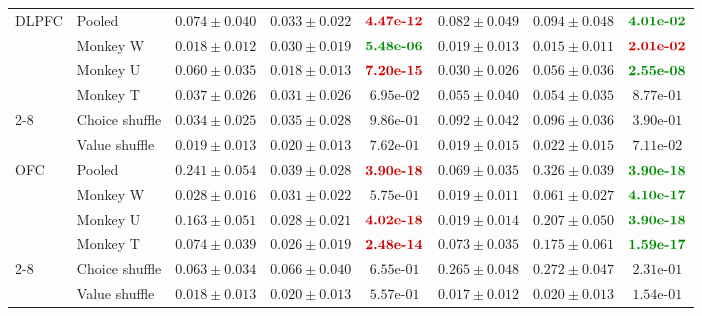 \documentclass[pdflatex,sn-mathphys-num]{sn-jnl}%
\begin{document}
\begin{table}[p]
\begin{tabular*}{\textwidth}{@{\extracolsep{\fill}}llcccccc@{}}
\midrule
DLPFC & Pooled & $0.074 \pm  0.040$ & $0.033 \pm  0.022$ & $\textcolor[HTML]{CC0000}{\text{\bfseries \mbox{4.47e-12}}}$ & $0.082 \pm  0.049$ & $0.094 \pm  0.048$ & $\textcolor[HTML]{008C00}{\text{\bfseries \mbox{4.01e-02}}}$ \\
  & Monkey W & $0.018 \pm  0.012$ & $0.030 \pm  0.019$ & $\textcolor[HTML]{008C00}{\text{\bfseries \mbox{5.48e-06}}}$ & $0.019 \pm  0.013$ & $0.015 \pm  0.011$ & $\textcolor[HTML]{CC0000}{\text{\bfseries \mbox{2.01e-02}}}$ \\
  & Monkey U & $0.060 \pm  0.035$ & $0.018 \pm  0.013$ & $\textcolor[HTML]{CC0000}{\text{\bfseries \mbox{7.20e-15}}}$ & $0.030 \pm  0.026$ & $0.056 \pm  0.036$ & $\textcolor[HTML]{008C00}{\text{\bfseries \mbox{2.55e-08}}}$ \\
  & Monkey T & $0.037 \pm  0.026$ & $0.031 \pm  0.026$ & $\mbox{6.95e-02}$ & $0.055 \pm  0.040$ & $0.054 \pm  0.035$ & $\mbox{8.77e-01}$ \\
\cmidrule(l){2-8}
  & Choice shuffle & $0.034 \pm  0.025$ & $0.035 \pm  0.028$ & $\mbox{9.86e-01}$ & $0.092 \pm  0.042$ & $0.096 \pm  0.036$ & $\mbox{3.90e-01}$ \\
  & Value shuffle & $0.019 \pm  0.013$ & $0.020 \pm  0.013$ & $\mbox{7.62e-01}$ & $0.019 \pm  0.015$ & $0.022 \pm  0.015$ & $\mbox{7.11e-02}$ \\
\midrule
OFC & Pooled & $0.241 \pm  0.054$ & $0.039 \pm  0.028$ & $\textcolor[HTML]{CC0000}{\text{\bfseries \mbox{3.90e-18}}}$ & $0.069 \pm  0.035$ & $0.326 \pm  0.039$ & $\textcolor[HTML]{008C00}{\text{\bfseries \mbox{3.90e-18}}}$ \\
  & Monkey W & $0.028 \pm  0.016$ & $0.031 \pm  0.022$ & $\mbox{5.75e-01}$ & $0.019 \pm  0.011$ & $0.061 \pm  0.027$ & $\textcolor[HTML]{008C00}{\text{\bfseries \mbox{4.10e-17}}}$ \\
  & Monkey U & $0.163 \pm  0.051$ & $0.028 \pm  0.021$ & $\textcolor[HTML]{CC0000}{\text{\bfseries \mbox{4.02e-18}}}$ & $0.019 \pm  0.014$ & $0.207 \pm  0.050$ & $\textcolor[HTML]{008C00}{\text{\bfseries \mbox{3.90e-18}}}$ \\
  & Monkey T & $0.074 \pm  0.039$ & $0.026 \pm  0.019$ & $\textcolor[HTML]{CC0000}{\text{\bfseries \mbox{2.48e-14}}}$ & $0.073 \pm  0.035$ & $0.175 \pm  0.061$ & $\textcolor[HTML]{008C00}{\text{\bfseries \mbox{1.59e-17}}}$ \\
\cmidrule(l){2-8}
  & Choice shuffle & $0.063 \pm  0.034$ & $0.066 \pm  0.040$ & $\mbox{6.55e-01}$ & $0.265 \pm  0.048$ & $0.272 \pm  0.047$ & $\mbox{2.31e-01}$ \\
  & Value shuffle & $0.018 \pm  0.013$ & $0.020 \pm  0.013$ & $\mbox{5.57e-01}$ & $0.017 \pm  0.012$ & $0.020 \pm  0.013$ & $\mbox{1.54e-01}$ \\
\bottomrule\end{tabular*}\endgroup\end{table}
\end{document}
